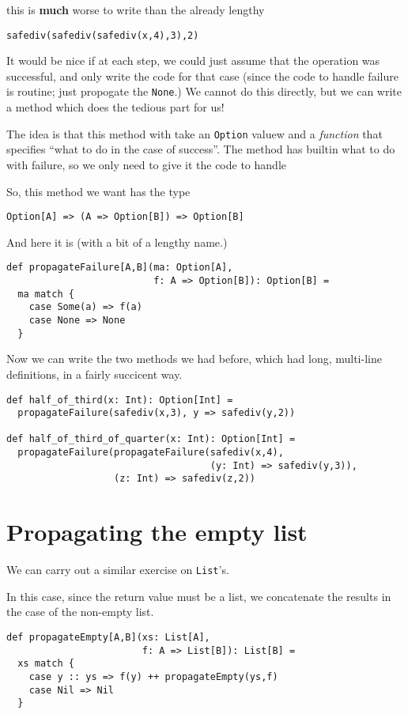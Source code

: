 \documentclass[11pt]{article}
\begin{document}
this is \textbf{much} worse to write than the already lengthy
\begin{verbatim}
safediv(safediv(safediv(x,4),3),2)
\end{verbatim}

It would be nice if at each step, we could just assume that the
operation was successful, and only write the code
for that case (since the code to handle failure is routine;
just propogate the \texttt{None}.)
We cannot do this directly, but we can write a method
which does the tedious part for us! 

The idea is that this method with take an \texttt{Option} valuew
and a \emph{function} that specifies “what to do in the case of success”.
The method has builtin what to do with failure,
so we only need to give it the code to handle

So, this method we want has the type
\begin{verbatim}
Option[A] => (A => Option[B]) => Option[B]
\end{verbatim}

And here it is (with a bit of a lengthy name.)
\begin{verbatim}
def propagateFailure[A,B](ma: Option[A],
                          f: A => Option[B]): Option[B] =
  ma match {
    case Some(a) => f(a)
    case None => None
  }
\end{verbatim}

Now we can write the two methods we had before,
which had long, multi-line definitions,
in a fairly succicent way.
\begin{verbatim}
def half_of_third(x: Int): Option[Int] =
  propagateFailure(safediv(x,3), y => safediv(y,2))

def half_of_third_of_quarter(x: Int): Option[Int] =
  propagateFailure(propagateFailure(safediv(x,4),
                                    (y: Int) => safediv(y,3)),
                   (z: Int) => safediv(z,2))
\end{verbatim}

\section{Propagating the empty list}
\label{sec:orge09bfb0}
We can carry out a similar exercise on \texttt{List}'s.

In this case, since the return value must be a list,
we concatenate the results in the case of the non-empty list.
\begin{verbatim}
def propagateEmpty[A,B](xs: List[A],
                        f: A => List[B]): List[B] =
  xs match {
    case y :: ys => f(y) ++ propagateEmpty(ys,f)
    case Nil => Nil
  }
\end{verbatim}
\end{document}
